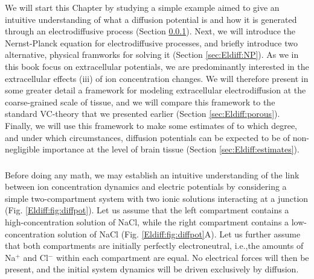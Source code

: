 We will start this Chapter by studying a simple example aimed to give an intuitive understanding of what a diffusion potential is and how it is generated through an electrodiffusive process (Section \ref{sec:Eldiff:LJpot}). Next, we will introduce the Nernst-Planck equation for electrodiffusive processes, and briefly introduce two alternative, physical framworks for solving it (Section \ref{sec:Eldiff:NP}). As we in this book focus on extracellular potentials, we are predominantly interested in the extracellular effects (iii) of ion concentration changes. We  will therefore present in some greater detail a framework for modeling extracellular electrodiffusion at the coarse-grained scale of tissue, and we will compare this framework to the standard VC-theory that we presented earlier (Section \ref{sec:Eldiff:porous}). Finally, we will use this framework to make some estimates of to which degree, and under which circumstances, diffusion potentials can be expected to be of non-negligible importance at the level of brain tissue (Section \ref{sec:Eldiff:estimates}).


\subsubsection{}
\label{sec:Eldiff:LJpot}
Before doing any math, we may establish an intuitive understanding of the link between ion concentration dynamics and electric potentials by considering a simple two-compartment system with two ionic solutions interacting at a junction  (Fig. \ref{Eldiff:fig:diffpot}). Let us assume that the left compartment contains a high-concentration solution of NaCl, while the right compartment contains a low-concentration solution of NaCl (Fig. \ref{Eldiff:fig:diffpot}A). Let us further assume that both compartments are initially perfectly electroneutral, i.e.,the amounts of Na$^+$ and Cl$^-$ within each compartment are equal. No  electrical forces will then be present, and the initial system dynamics will be driven exclusively by diffusion. 

